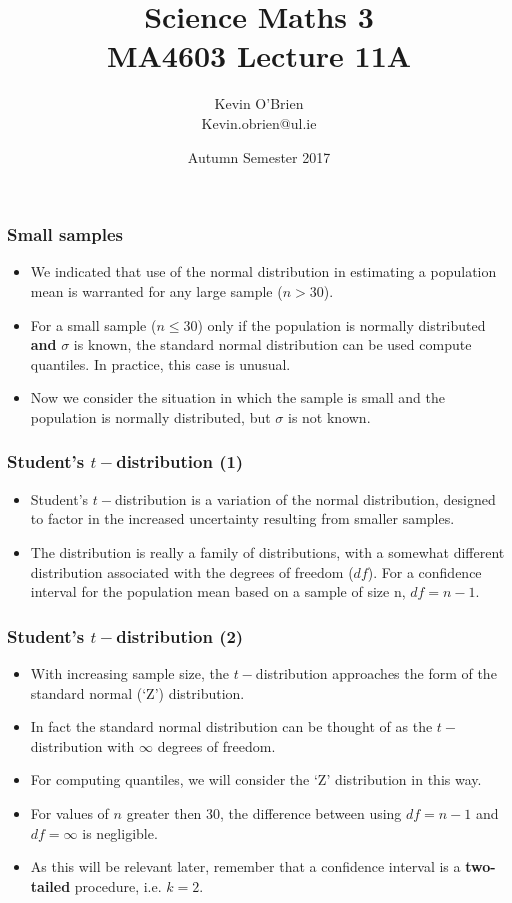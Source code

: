 \documentclass[a4]{beamer}
\title[MA4603]{Science Maths 3 \\ {\normalsize MA4603 Lecture 11A}}
\author[Kevin O'Brien]{Kevin O'Brien \\ {\scriptsize Kevin.obrien@ul.ie}}
\date{Autumn Semester 2017}
\institute[Maths \& Stats]{Dept. of Mathematics \& Statistics, \\ University \textit{of} Limerick}
\begin{document}
\begin{frame}
\frametitle{Small samples}
\begin{itemize} \item We indicated that use of the normal distribution in estimating a population mean is warranted
for any large sample ($n > 30$). \item For a small sample ($n \leq 30$) only if the population is normally distributed
\textbf{and} $\sigma$ is known, the standard normal distribution can be used compute quantiles. In practice,
this case is unusual.
\item Now we consider the situation in which the sample is small and the population is normally distributed,
but $\sigma$ is not known.
\end{itemize}
\end{frame}
\begin{frame}
\frametitle{Student's $t-$distribution (1)}
\begin{itemize}
\item Student's $t-$distribution is a variation of the normal distribution, designed to factor in the increased uncertainty resulting from smaller samples.
\item The distribution is really a family of distributions, with
a somewhat different distribution associated with the degrees of freedom ($df$). For a confidence interval for the
population mean based on a sample of size n, $df = n - 1$.
\end{itemize}
\end{frame}

\begin{frame}
\frametitle{Student's $t-$distribution (2)}
\begin{itemize}
\item With increasing
sample size, the $t-$distribution approaches the form of the standard normal (`Z') distribution.
\item In fact the standard normal distribution can be thought of as the $t-$distribution with $\infty$ degrees of freedom.
\item For computing quantiles, we will consider the `Z' distribution in this way.
\item For values of $n$ greater then 30, the difference between using $df = n-1$ and $df = \infty$ is negligible.

\item As this will be relevant later, remember that a confidence interval is a \textbf{two-tailed} procedure, i.e. $k=2$.
\end{itemize}
\end{frame}
\end{document}
